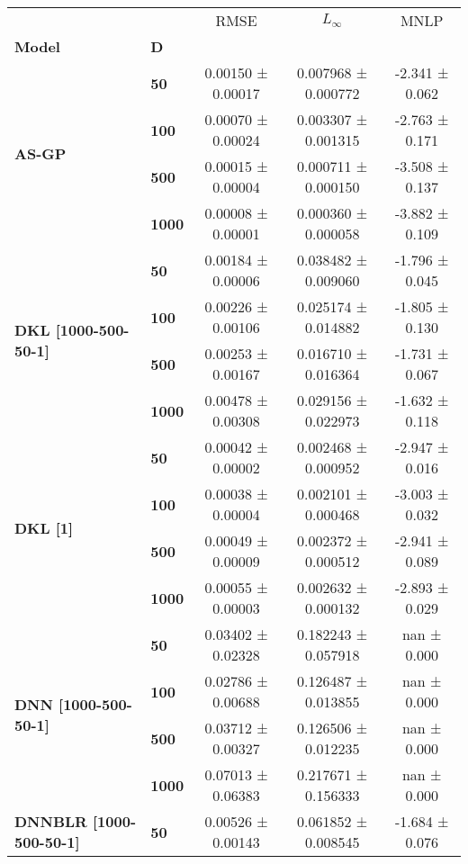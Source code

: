 \begin{tabular}{llccc}
\toprule
      &      &               RMSE &           $L_\infty$ &            MNLP \\
\textbf{Model} & \textbf{D} &                    &                      &                 \\
\midrule
\multirow{4}{*}{\textbf{AS-GP}} & \textbf{50  } &  0.00150 ± 0.00017 &  0.007968 ± 0.000772 &  -2.341 ± 0.062 \\
      & \textbf{100 } &  0.00070 ± 0.00024 &  0.003307 ± 0.001315 &  -2.763 ± 0.171 \\
      & \textbf{500 } &  0.00015 ± 0.00004 &  0.000711 ± 0.000150 &  -3.508 ± 0.137 \\
      & \textbf{1000} &  0.00008 ± 0.00001 &  0.000360 ± 0.000058 &  -3.882 ± 0.109 \\
\cline{1-5}
\multirow{4}{*}{\textbf{DKL [1000-500-50-1]}} & \textbf{50  } &  0.00184 ± 0.00006 &  0.038482 ± 0.009060 &  -1.796 ± 0.045 \\
      & \textbf{100 } &  0.00226 ± 0.00106 &  0.025174 ± 0.014882 &  -1.805 ± 0.130 \\
      & \textbf{500 } &  0.00253 ± 0.00167 &  0.016710 ± 0.016364 &  -1.731 ± 0.067 \\
      & \textbf{1000} &  0.00478 ± 0.00308 &  0.029156 ± 0.022973 &  -1.632 ± 0.118 \\
\cline{1-5}
\multirow{4}{*}{\textbf{DKL [1]}} & \textbf{50  } &  0.00042 ± 0.00002 &  0.002468 ± 0.000952 &  -2.947 ± 0.016 \\
      & \textbf{100 } &  0.00038 ± 0.00004 &  0.002101 ± 0.000468 &  -3.003 ± 0.032 \\
      & \textbf{500 } &  0.00049 ± 0.00009 &  0.002372 ± 0.000512 &  -2.941 ± 0.089 \\
      & \textbf{1000} &  0.00055 ± 0.00003 &  0.002632 ± 0.000132 &  -2.893 ± 0.029 \\
\cline{1-5}
\multirow{4}{*}{\textbf{DNN [1000-500-50-1]}} & \textbf{50  } &  0.03402 ± 0.02328 &  0.182243 ± 0.057918 &     nan ± 0.000 \\
      & \textbf{100 } &  0.02786 ± 0.00688 &  0.126487 ± 0.013855 &     nan ± 0.000 \\
      & \textbf{500 } &  0.03712 ± 0.00327 &  0.126506 ± 0.012235 &     nan ± 0.000 \\
      & \textbf{1000} &  0.07013 ± 0.06383 &  0.217671 ± 0.156333 &     nan ± 0.000 \\
\cline{1-5}
\multirow{4}{*}{\textbf{DNNBLR [1000-500-50-1]}} & \textbf{50  } &  0.00526 ± 0.00143 &  0.061852 ± 0.008545 &  -1.684 ± 0.076 \\

\end{tabular}
